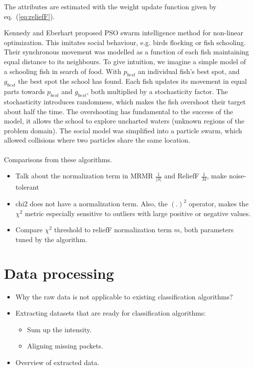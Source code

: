 \documentclass[runningheads]{llncs}
\begin{document}
The attributes are estimated with the weight update function given by eq.~(\ref{eq:reliefF}). 

Kennedy and Eberhart proposed PSO \cite{kennedy1995particle} swarm intelligence method for non-linear optimization.
This imitates social behaviour, e.g. birds flocking or fish schooling.
Their synchronous movement was modelled as a function of each fish maintaining equal distance to its neighbours. 
To give intuition, we imagine a simple model of a schooling fish in search of food. 
With $p_{best}$ an individual fish's best spot, and $g_{best}$ the best spot the school has found. 
Each fish updates its movement in equal parts towards $p_{best}$ and $g_{best}$, both multiplied by a stochasticity factor.
The stochasticity introduces randomness, which makes the fish overshoot their target about half the time. 
The overshooting has fundamental to the success of the model, it allows the school to explore uncharted waters (unknown regions of the problem domain). 
The social model was simplified into a particle swarm, which allowed collisions where two particles share the same location. 
\\\\
Comparisons from these algorithms. 
\begin{itemize}
  \item Talk about the normalization term in MRMR $\frac{1}{|S|}$ and ReliefF $\frac{1}{M}$, make noise-tolerant
  \item chi2 does not have a normalization term. Also, the $(.)^2$ operator, makes the $\chi^2$ metric especially sensitive to outliers with large positive or negative values. 
  \item Compare $\chi^2$ threshold to reliefF normalization term $m$, both parameters tuned by the algorithm. 
\end{itemize}

\section{Data processing}


\begin{itemize}
  \item Why the raw data is not applicable to existing classification algorithms?
  \item Extracting datasets that are ready for classification algorithms:
        \begin{itemize}
          \item Sum up the intensity.
          \item Aligning missing packets.
        \end{itemize}
  \item Overview of extracted data.
\end{itemize}
\end{document}
